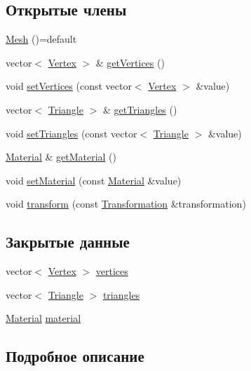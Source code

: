 \subsection*{Открытые члены}
\begin{DoxyCompactItemize}
\item 
\hyperlink{class_mesh_ae6b6c56f0ebfa2f6b2b10d25a835c865}{Mesh} ()=default
\item 
vector$<$ \hyperlink{class_vertex}{Vertex} $>$ \& \hyperlink{class_mesh_a1844b662689440a6c5ad761c53be4f94}{get\+Vertices} ()
\item 
void \hyperlink{class_mesh_a5c68963c5e297f561932ae51d1f0e8f5}{set\+Vertices} (const vector$<$ \hyperlink{class_vertex}{Vertex} $>$ \&value)
\item 
vector$<$ \hyperlink{class_triangle}{Triangle} $>$ \& \hyperlink{class_mesh_a7674d50589acad6a336f264d007e71c9}{get\+Triangles} ()
\item 
void \hyperlink{class_mesh_a26adb872946b00793f84f8cecd48cc56}{set\+Triangles} (const vector$<$ \hyperlink{class_triangle}{Triangle} $>$ \&value)
\item 
\hyperlink{class_material}{Material} \& \hyperlink{class_mesh_add1ff13540509dc02be32fa791c22352}{get\+Material} ()
\item 
void \hyperlink{class_mesh_a16e6aa53eab442ce66381e67259be050}{set\+Material} (const \hyperlink{class_material}{Material} \&value)
\item 
void \hyperlink{class_mesh_a6261935dee415d96a87e3db58cdbe6a2}{transform} (const \hyperlink{class_transformation}{Transformation} \&transformation)
\end{DoxyCompactItemize}
\subsection*{Закрытые данные}
\begin{DoxyCompactItemize}
\item 
vector$<$ \hyperlink{class_vertex}{Vertex} $>$ \hyperlink{class_mesh_abe5c05c224e47ba1e8b6393759798a9b}{vertices}
\item 
vector$<$ \hyperlink{class_triangle}{Triangle} $>$ \hyperlink{class_mesh_a2b30e4823d6d0d17c115018065bd1e91}{triangles}
\item 
\hyperlink{class_material}{Material} \hyperlink{class_mesh_a3368c3bc60dd176e522df1542b764847}{material}
\end{DoxyCompactItemize}


\subsection{Подробное описание}


